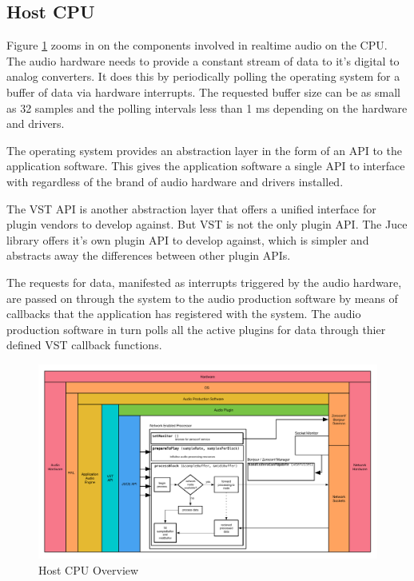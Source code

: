 \subsection{Host CPU}

Figure \ref{fig:arch_02} zooms in on the components involved in realtime audio on the CPU. The audio hardware needs to provide a constant stream of data to it's digital to analog converters. It does this by periodically polling the operating system for a buffer of data via hardware interrupts. The requested buffer size can be as small as 32 samples and the polling intervals less than 1 ms depending on the hardware and drivers.

The operating system provides an abstraction layer in the form of an API to the application software. This gives the application software a single API to interface with regardless of the brand of audio hardware and drivers installed.

The VST API is another abstraction layer that offers a unified interface for plugin vendors to develop against. But VST is not the only plugin API. The Juce library offers it's own plugin API to develop against, which is simpler and abstracts away the differences between other plugin APIs.

The requests for data, manifested as interrupts triggered by the audio hardware, are passed on through the system to the audio production software by means of callbacks that the application has registered with the system. The audio production software in turn polls all the active plugins for data through thier defined VST callback functions.

\begin{figure}[H]
    \centering
    \includegraphics[width=\textwidth]{assets/architecture_02.pdf}
    \caption{Host CPU Overview}
    \label{fig:arch_02}
\end{figure}

